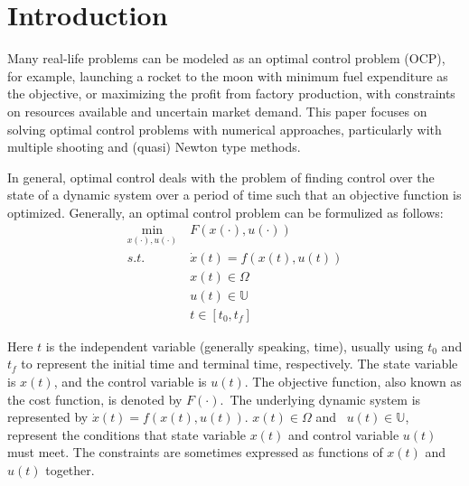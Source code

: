 \documentclass  [
  paper    = a4,
  BCOR     = 10mm,
  twoside,
  fontsize = 12pt,
  fleqn,
  toc      = bibnumbered,
  toc      = listofnumbered,
  numbers  = noendperiod,
  headings = normal,
  listof   = leveldown,
  version  = 3.03
]                                       {scrreprt}
\newcommand{\<}{\langle}
\renewcommand{\>}{\rangle}
\begin{document}
   
   \tableofcontents
    \let\clearpage\relax
   \newpage
   
   
 \chapter{Introduction}  
 \label{Chapter1}
Many real-life problems can be modeled as an optimal control problem (OCP), for example, launching a rocket to the moon with minimum fuel expenditure as the objective, or maximizing the profit from factory production, with constraints on resources available and uncertain market demand. This paper focuses on solving optimal control problems with numerical approaches, particularly with multiple shooting and (quasi) Newton type methods. 

In general, optimal control deals with the problem of finding control over the state of a dynamic system over a period of time such that an objective function is optimized. Generally, an optimal control problem can be formulized as follows: 
      \begin{equation}
   	\begin{aligned}
   	\underset{x(\cdot), u(\cdot)}{\text{min}}  \ &  F(x(\cdot), u(\cdot)) \\
   		s.t.\ \  &  \dot{x} (t) = f(x(t), u(t))\\ 
   		        & x(t) \in \Omega \\
   		          & u(t) \in \mathbb{U}  \\
   		          & t \in [t_0, t_f]
   	\end{aligned}
   	\label{P1_OPH}
   \end{equation}
 
 
Here $t$ is the independent variable (generally speaking, time), usually using $t_0$ and $t_f$ to represent the initial time and terminal time, respectively. The state variable is $x(t)$, and the control variable is $u(t)$. The objective function, also known as the cost function, is denoted by $F(\cdot)$. The underlying dynamic system is represented by $\dot{x} (t) = f(x(t), u(t))$. $x(t) \in \Omega$ and  $u(t) \in \mathbb{U}$, represent the conditions that state variable $x(t)$ and control variable $u(t)$ must meet. The constraints are sometimes expressed as functions of $x(t)$ and $u(t)$  together.
\end{document}
